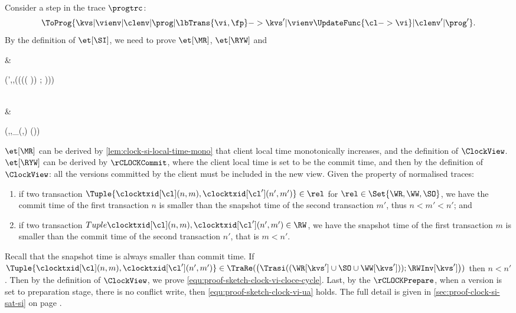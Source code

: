 \begin{proofsketch}
    Consider a step in the trace \( \progtrc \):
    \[
        \ToProg{\kvs | \vienv | \clenv | \prog | \lbTrans{\vi,\fp}
                -> \kvs' | \vienv\UpdateFunc{\cl -> \vi} | \clenv' | \prog' } .
    \]
    By the definition of \( \et[\SI] \),
    we need to prove \( \et[\MR]\), \( \et[\RYW] \) and
    \begin{Formulae}
    & \begin{Formula}
    \PreClosed(\kvs',\vi,\TraRe(\left({\Trasi(( \WR[\kvs'] \cup \SO \cup \WW[\kvs']))} ; \RWInv[\kvs'] \right)))
    \label{equ:proof-sketch-clock-vi-cloce-cycle}
    \end{Formula}
    \\ & \begin{Formula}
    \PreClosed(\kvs,\vi,\bigcup_{\opW(\key,\stub) \in \fp}\WWInv[\kvs'](\key))
    \label{equ:proof-sketch-clock-vi-ua}
    \end{Formula}
    \end{Formulae}
    \( \et[\MR]\) can be derived by \cref{lem:clock-si-local-time-mono} 
    that client local time monotonically increases,
    and the definition of \( \ClockView \).
    \( \et[\RYW]\) can be derived by \( \rCLOCKCommit \), 
    where the client local time is set to be the commit time,
    and  then by the definition of \( \ClockView \):
    all the versions committed by the client must be included in the new view.
    Given the property of normalised traces:
    \begin{enumerate}
    \item if two transaction \( \Tuple{\clocktxid[\cl](n,m), \clocktxid[\cl'](n',m')} \in \rel \)
    for \( \rel \in \Set{\WR,\WW,\SO} \),
    we have the commit time of the first transaction \( n \) is smaller than the snapshot time of the second transaction \( m' \),
    thus \( n < m' < n'\); and
    \item if two transaction \( Tuple{\clocktxid[\cl](n,m), \clocktxid[\cl'](n',m')} \in \RW \),
    we have the snapshot time of the first transaction \( m \) is smaller than the commit time of the second transaction \( n' \),
    that is \( m < n'\).
    \end{enumerate}
    Recall that the snapshot time is always smaller than commit time.
    If \( \Tuple{\clocktxid[\cl](n,m), \clocktxid[\cl'](n',m')} \in \TraRe(\left({\Trasi(( \WR[\kvs'] \cup \SO \cup \WW[\kvs']))} ; \RWInv[\kvs'] \right)) \)
    then \( n < n' \).
    Then by the definition of \( \ClockView \), we prove \cref{equ:proof-sketch-clock-vi-cloce-cycle}.
    Last, by the \( \rCLOCKPrepare \), when a version is set to preparation stage, there is no conflict write,
    then \cref{equ:proof-sketch-clock-vi-ua} holds.
    The full detail is given in \cref{sec:proof-clock-si-sat-si}
    on page \pageref{sec:proof-clock-si-sat-si}.
\end{proofsketch}

